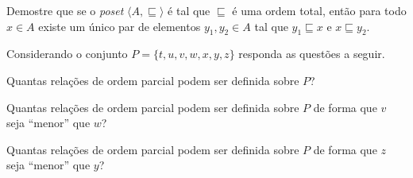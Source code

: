 \begin{problem}\label{prob:EquivalenciaOrdem23}
	Demostre que se o \textit{poset} $\langle A, \sqsubseteq \rangle$ é tal que $\sqsubseteq$ é uma ordem total, então para todo $x \in A$ existe um único par de elementos $y_1, y_2 \in A$ tal que $y_1 \sqsubseteq x$ e $x \sqsubseteq y_2$.
\end{problem}

\begin{problem}\label{prob:EquivalenciaOrdem24}
	Considerando o conjunto $P = \{t, u, v, w, x, y, z\}$ responda as questões a seguir.
\end{problem}

\begin{exerList}
	\item Quantas relações de ordem parcial podem ser definida sobre $P$?
	\item Quantas relações de ordem parcial podem ser definida sobre $P$ de forma que $v$ seja ``menor'' que $w$?
	\item Quantas relações de ordem parcial podem ser definida sobre $P$ de forma que $z$ seja ``menor'' que $y$?
\end{exerList}